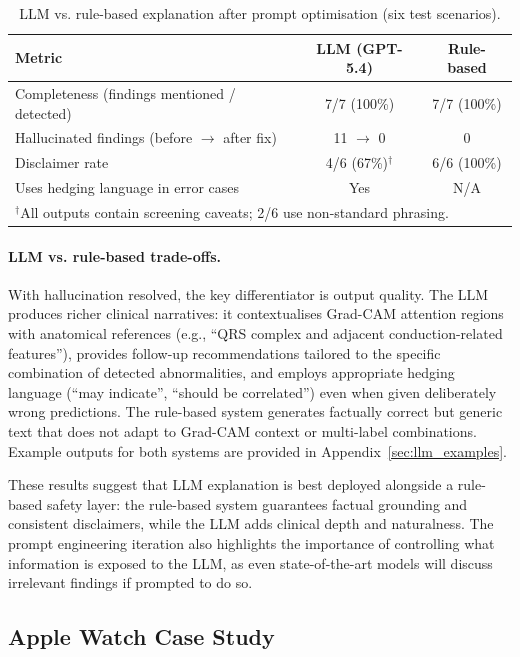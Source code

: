 \documentclass[10pt]{article}
\begin{document}
\begin{table}[t]
\caption{LLM vs. rule-based explanation after prompt optimisation (six test scenarios).}
\label{tab:llm_eval}
\begin{center}
\begin{tabular}{lcc}
\toprule
Metric & LLM (GPT-5.4) & Rule-based \\
\midrule
Completeness (findings mentioned / detected) & 7/7 (100\%) & 7/7 (100\%) \\
Hallucinated findings (before $\rightarrow$ after fix) & 11 $\rightarrow$ 0 & 0 \\
Disclaimer rate & 4/6 (67\%)$^\dagger$ & 6/6 (100\%) \\
Uses hedging language in error cases & Yes & N/A \\
\bottomrule
\multicolumn{3}{l}{\footnotesize $^\dagger$All outputs contain screening caveats; 2/6 use non-standard phrasing.}
\end{tabular}
\end{center}
\end{table}

\paragraph{LLM vs. rule-based trade-offs.} With hallucination resolved, the key differentiator is output quality. The LLM produces richer clinical narratives: it contextualises Grad-CAM attention regions with anatomical references (e.g., ``QRS complex and adjacent conduction-related features''), provides follow-up recommendations tailored to the specific combination of detected abnormalities, and employs appropriate hedging language (``may indicate'', ``should be correlated'') even when given deliberately wrong predictions. The rule-based system generates factually correct but generic text that does not adapt to Grad-CAM context or multi-label combinations. Example outputs for both systems are provided in Appendix~\ref{sec:llm_examples}.

These results suggest that LLM explanation is best deployed alongside a rule-based safety layer: the rule-based system guarantees factual grounding and consistent disclaimers, while the LLM adds clinical depth and naturalness. The prompt engineering iteration also highlights the importance of controlling what information is exposed to the LLM, as even state-of-the-art models will discuss irrelevant findings if prompted to do so.

\subsection{Apple Watch Case Study}
\end{document}
